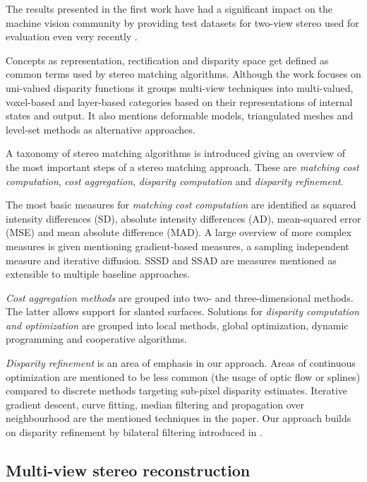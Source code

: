 \documentclass{ucl_thesis}
\begin{document}
\par The results presented in the first work have had a significant impact on the machine vision community by providing test datasets for two-view stereo used for evaluation even very recently \cite{Yang12} \cite{MacAodhaDepthSuperResECCV2012}. 
\par Concepts as representation, rectification and disparity space get defined as common terms used by stereo matching algorithms. Although the work focuses on uni-valued disparity functions it groups multi-view techniques into multi-valued, voxel-based and layer-based categories based on their representations of internal states and output. It also mentions deformable models, triangulated meshes and level-set methods as alternative approaches.
\par A taxonomy of stereo matching algorithms is introduced giving an overview of the most important steps of a stereo matching approach. These are {\it matching cost computation}, {\it cost aggregation}, {\it disparity computation} and {\it disparity refinement}.
\par The most basic measures for {\it matching cost computation} are identified as squared intensity differences (SD), absolute intensity differences (AD), mean-squared error (MSE) and mean absolute difference (MAD). A large overview of more complex measures is given mentioning gradient-based measures, a sampling independent measure and iterative diffusion. SSSD and SSAD are measures mentioned as extensible to multiple baseline approaches.
\par {\it Cost aggregation methods} are grouped into two- and three-dimensional methods. The latter allows support for slanted surfaces. Solutions for {\it disparity computation and optimization} are grouped into local methods, global optimization, dynamic programming and cooperative algorithms. 
\par {\it Disparity refinement} is an area of emphasis in our approach. Areas of continuous optimization are mentioned to be less common (the usage of optic flow or splines) compared to discrete methods targeting sub-pixel disparity estimates. Iterative gradient descent, curve fitting, median filtering and propagation over neighbourhood are the mentioned techniques in the paper. Our approach builds on disparity refinement by bilateral filtering introduced in \cite{cvpr-07-qingxiong-yang}.

\subsection{Multi-view stereo reconstruction}
\end{document}

